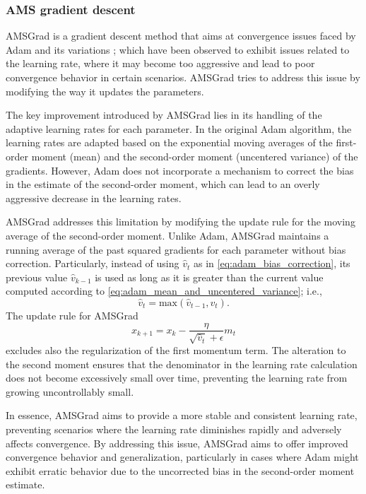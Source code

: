 \subsubsection{AMS gradient descent}


AMSGrad is a gradient descent method that aims at convergence issues faced by Adam and its variations \cite{Reddi2019convergenceadam}; which have been observed to exhibit issues related to the learning rate, where it may become too aggressive and lead to poor convergence behavior in certain scenarios. AMSGrad tries to address this issue by modifying the way it updates the parameters. 

The key improvement introduced by AMSGrad lies in its handling of the adaptive learning rates for each parameter. In the original Adam algorithm, the learning rates are adapted based on the exponential moving averages of the first-order moment (mean) and the second-order moment (uncentered variance) of the gradients. However, Adam does not incorporate a mechanism to correct the bias in the estimate of the second-order moment, which can lead to an overly aggressive decrease in the learning rates.

AMSGrad addresses this limitation by modifying the update rule for the moving average of the second-order moment. Unlike Adam, AMSGrad maintains a running average of the past squared gradients for each parameter without bias correction. Particularly, instead of using $\hat{v}_t$ as in \eqref{eq:adam_bias_correction}, its previous value $\hat{v}_{k-1}$ is used as long as it is greater than the current value computed according to \eqref{eq:adam_mean_and_uncentered_variance}; i.e.,
\begin{equation}
	\hat{v}_t = \text{max}(\hat{v}_{t-1}, v_t).
\end{equation}
The update rule for AMSGrad 
\begin{equation}
	x_{k+1} = x_{k} - \dfrac{\eta}{\sqrt{\hat{v}_t} + \epsilon} m_t
\end{equation}
excludes also the regularization of the first momentum term. The alteration to the second moment ensures that the denominator in the learning rate calculation does not become excessively small over time, preventing the learning rate from growing uncontrollably small.

In essence, AMSGrad aims to provide a more stable and consistent learning rate, preventing scenarios where the learning rate diminishes rapidly and adversely affects convergence. By addressing this issue, AMSGrad aims to offer improved convergence behavior and generalization, particularly in cases where Adam might exhibit erratic behavior due to the uncorrected bias in the second-order moment estimate.


